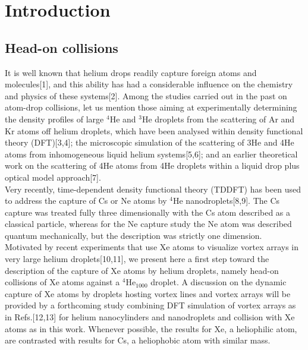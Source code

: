 \chapter{Introduction}
	\section{Head-on collisions}
		It is well known that helium drops readily capture foreign atoms and molecules[1], and this ability has had a considerable influence on the chemistry and physics of these systems[2]. Among the studies carried out in the past on atom-drop collisions, let us mention those aiming at experimentally determining the density profiles of large $^4$He and $^3$He droplets from the scattering of Ar and Kr atoms off helium droplets, which have been analysed within density functional theory (DFT)[3,4]; the microscopic simulation of the scattering of 3He and 4He atoms from inhomogeneous liquid helium systems[5,6]; and an earlier theoretical work on the scattering of 4He atoms from 4He droplets within a liquid drop plus optical model approach[7].\\

		Very recently, time-dependent density functional theory (TDDFT) has been used to address the capture of Cs or Ne atoms by $^4$He nanodroplets[8,9]. The Cs capture was treated fully three dimensionally with the Cs atom described as a classical particle, whereas for the Ne capture study the Ne atom was described quantum mechanically, but the description was strictly one dimension.\\

		Motivated by recent experiments that use Xe atoms to visualize vortex arrays in very large helium droplets[10,11], we present here a first step toward the description of the capture of Xe atoms by helium droplets, namely head-on collisions of Xe atoms against a $^4$He$_{1000}$ droplet. A discussion on the dynamic capture of Xe atoms by droplets hosting vortex lines and vortex arrays will be provided by a forthcoming study combining DFT simulation of vortex arrays as in Refs.[12,13] for helium nanocylinders and nanodroplets and collision with Xe atoms as in this work. Whenever possible, the results for Xe, a heliophilic atom, are contrasted with results for Cs, a heliophobic atom with similar mass.

